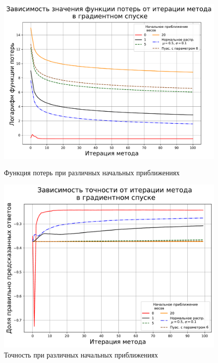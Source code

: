 \documentclass{article}
\begin{document}
\begin{itemize}
\begin{figure}[H]	
    \begin{minipage}{8cm}
        \centering
        \includegraphics[scale=0.35]{TASK2 weights loss.pdf}
        \caption{Функция потерь при различных начальных приближениях}
        \label{fig:weights_loss}
    \end{minipage}
	\begin{minipage}{8cm}
		\centering
		\includegraphics[scale=0.35]{TASK2 weights accuracy.pdf}
		\caption{Точность при различных начальных приближениях}
		\label{fig:weights_accuracy}
	\end{minipage}
\end{figure}




\end{itemize}
\end{document}
